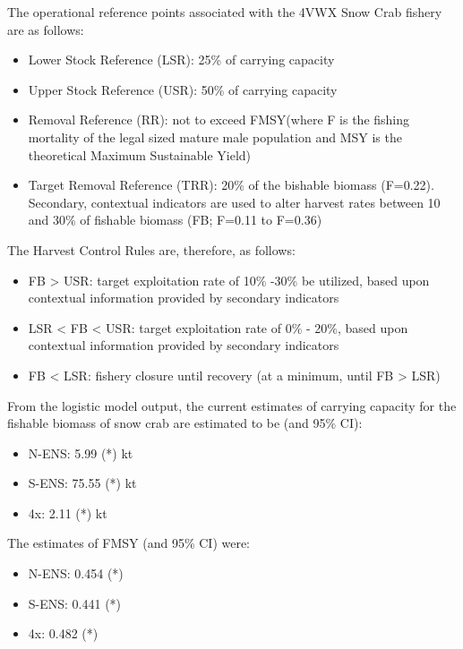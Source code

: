 \documentclass[paper=a4, fontsize=11pt]{article}
\begin{document}
The operational reference points associated with the 4VWX Snow Crab fishery are as follows: 
\begin{itemize}
  \item Lower Stock Reference (LSR): 25\% of carrying capacity\
  \item Upper Stock Reference (USR): 50\% of carrying capacity\
  \item Removal Reference (RR): not to exceed FMSY(where F is the fishing mortality of the legal sized mature male population and MSY is the theoretical Maximum Sustainable Yield)\
  \item Target Removal Reference (TRR): 20\% of the bishable biomass (F=0.22). Secondary, contextual indicators are used to alter harvest rates between 10 and 30\% of fishable biomass (FB; F=0.11 to F=0.36)
\end{itemize}

The Harvest Control Rules are, therefore, as follows:\
\begin{itemize}
  \item FB > USR: target exploitation rate of 10\% -30\% be utilized, based upon contextual information provided by secondary indicators\
  \item LSR < FB < USR: target exploitation rate of 0\% - 20\%, based upon contextual information provided by secondary indicators\
  \item FB < LSR: fishery closure until recovery (at a minimum, until FB > LSR)\\
\end{itemize}
\clearpage

From the logistic model output, the current estimates of carrying capacity for the fishable biomass of snow crab are estimated to be (and 95\% CI):\
\begin{itemize}
  \item N-ENS: 5.99 (*) kt\
  \item S-ENS: 75.55 (*) kt\
  \item 4x: 2.11 (*) kt\\
\end{itemize}

The estimates of FMSY (and 95\% CI) were:\
\begin{itemize}
  \item N-ENS: 0.454 (*)\
  \item S-ENS: 0.441 (*)\
  \item 4x: 0.482 (*)\\
\end{itemize}
\end{document}
